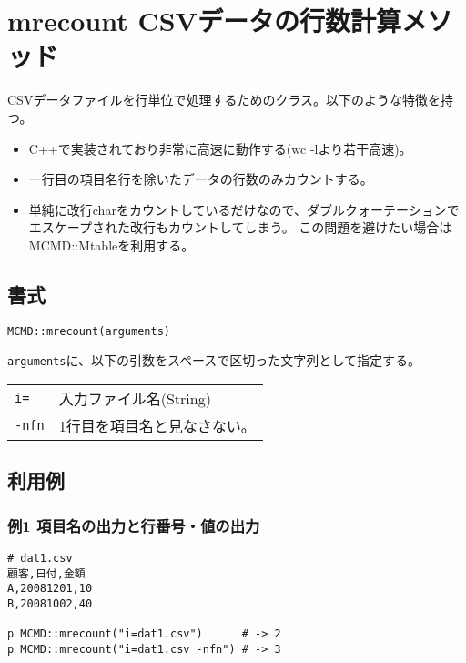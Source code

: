 
%

\section{mrecount CSVデータの行数計算メソッド\label{sect:mrecountRB}}
CSVデータファイルを行単位で処理するためのクラス。以下のような特徴を持つ。
\begin{itemize}
\setlength{\itemindent}{0mm}
\item C++で実装されており非常に高速に動作する(wc -lより若干高速)。
\item 一行目の項目名行を除いたデータの行数のみカウントする。
\item 単純に改行charをカウントしているだけなので、ダブルクォーテーションでエスケープされた改行もカウントしてしまう。
この問題を避けたい場合はMCMD::Mtableを利用する。
\end{itemize}

\subsection{書式}

{\large
\begin{verbatim}
MCMD::mrecount(arguments)
\end{verbatim}
}

\verb|arguments|に、以下の引数をスペースで区切った文字列として指定する。

\begin{table}[htbp]
\begin{tabular}{ll}
\verb|i=|    & 入力ファイル名(String)\\
\verb|-nfn|  & 1行目を項目名と見なさない。\\
\end{tabular} 
\end{table} 

\subsection{利用例}
\subsubsection*{例1 項目名の出力と行番号・値の出力}

\begin{Verbatim}[baselinestretch=0.7,frame=single]
# dat1.csv
顧客,日付,金額
A,20081201,10
B,20081002,40

p MCMD::mrecount("i=dat1.csv")      # -> 2
p MCMD::mrecount("i=dat1.csv -nfn") # -> 3
\end{Verbatim}


